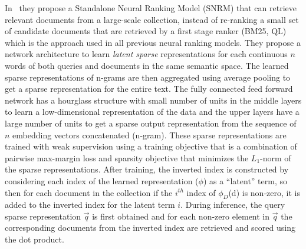 In~\citep{Zamani_neural_reranking_2018} they propose a \textsf{Standalone Neural Ranking Model} (SNRM) that can retrieve relevant documents from a large-scale collection, instead of re-ranking a small set of candidate documents that are retrieved by a first stage ranker (BM25, QL) which is the approach used in all previous neural ranking models. They propose a network architecture to learn \textit{latent sparse} representations for each continuous $n$ words of both queries and documents in the same semantic space. The learned sparse representations of n-grams are then aggregated using average pooling to get a sparse representation for the entire text. The fully connected feed forward network has a hourglass structure with small number of units in the middle layers to learn a low-dimensional representation of the data and the upper layers have a large number of units to get a sparse output representation from the sequence of $n$ embedding vectors concatenated (n-gram). These sparse representations are trained with weak supervision using a training objective that is a combination of pairwise max-margin loss and sparsity objective that minimizes the $L_1$-norm of the sparse representations. After training, the inverted index is constructed by considering each index of the learned representation ($\phi$) as a ``latent'' term, so then for each document in the collection if the $i^{th}$ index of $\phi_D$(d) is non-zero, it is added to the inverted index for the latent term $i$. During inference, the query sparse representation $\vec{q}$ is first obtained and for each non-zero element in $\vec{q}$ the corresponding documents from the inverted index are retrieved and scored using the dot product. 


